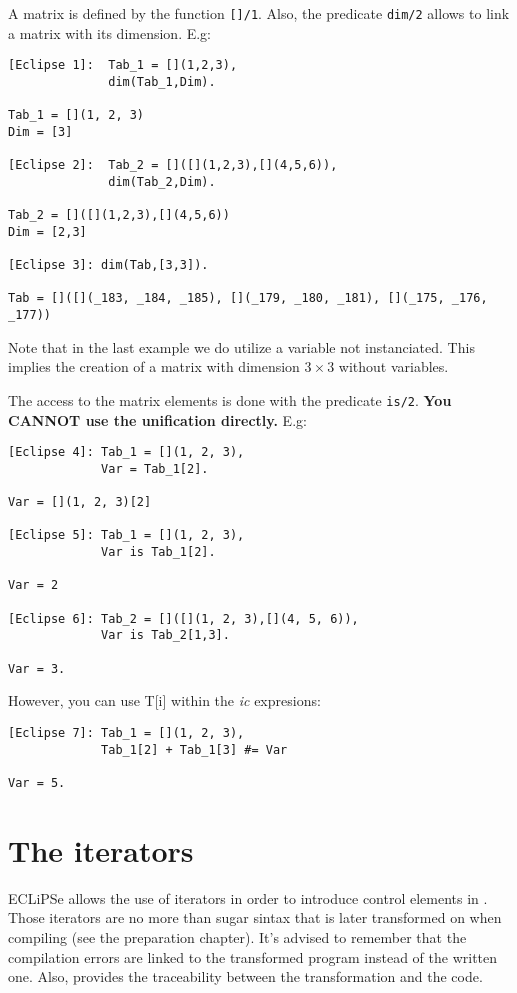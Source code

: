 A matrix is defined by the function \verb|[]/1|. Also, the predicate \verb|dim/2| allows to link a matrix with its dimension. E.g:
\begin{verbatim}
[Eclipse 1]:  Tab_1 = [](1,2,3),
              dim(Tab_1,Dim). 

Tab_1 = [](1, 2, 3)
Dim = [3]

[Eclipse 2]:  Tab_2 = []([](1,2,3),[](4,5,6)),
              dim(Tab_2,Dim). 

Tab_2 = []([](1,2,3),[](4,5,6))
Dim = [2,3]

[Eclipse 3]: dim(Tab,[3,3]).

Tab = []([](_183, _184, _185), [](_179, _180, _181), [](_175, _176, _177))
\end{verbatim}
Note that in the last example we do utilize a variable not instanciated. This implies the creation of a matrix with dimension $3 \times 3$ without variables.

The access to the matrix elements is done with the predicate 
\verb|is/2|. {\bf You CANNOT use the unification directly.} E.g:
\begin{verbatim}
[Eclipse 4]: Tab_1 = [](1, 2, 3),
             Var = Tab_1[2].

Var = [](1, 2, 3)[2]

[Eclipse 5]: Tab_1 = [](1, 2, 3),
             Var is Tab_1[2].

Var = 2

[Eclipse 6]: Tab_2 = []([](1, 2, 3),[](4, 5, 6)), 
             Var is Tab_2[1,3].

Var = 3.
\end{verbatim}
However, you can use T[i] within the \emph{ic} expresions:
\begin{verbatim}
[Eclipse 7]: Tab_1 = [](1, 2, 3),
             Tab_1[2] + Tab_1[3] #= Var

Var = 5.
\end{verbatim}


\section{The iterators}
ECLiPSe allows the use of iterators in order to introduce control elements in \prolog. Those iterators are no more than sugar sintax that is later transformed on \prolog{} when compiling (see the preparation chapter). It's advised to remember that the compilation errors are linked to the transformed program instead of the written one. Also, 
\eclipse{} provides the traceability between the transformation and the code.

